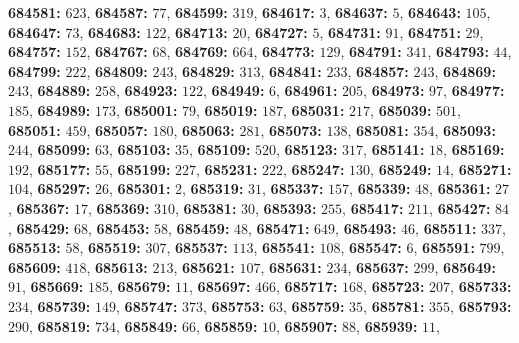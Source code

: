 \textsf{\bfseries 684581:} $623$, \textsf{\bfseries 684587:} $77$, \textsf{\bfseries 684599:} $319$, \textsf{\bfseries 684617:} $3$, \textsf{\bfseries 684637:} $5$, \textsf{\bfseries 684643:} $105$, \textsf{\bfseries 684647:} $73$, \textsf{\bfseries 684683:} $122$, \textsf{\bfseries 684713:} $20$, \textsf{\bfseries 684727:} $5$, \textsf{\bfseries 684731:} $91$, \textsf{\bfseries 684751:} $29$, \textsf{\bfseries 684757:} $152$, \textsf{\bfseries 684767:} $68$, \textsf{\bfseries 684769:} $664$, \textsf{\bfseries 684773:} $129$, \textsf{\bfseries 684791:} $341$, \textsf{\bfseries 684793:} $44$, \textsf{\bfseries 684799:} $222$, \textsf{\bfseries 684809:} $243$, \textsf{\bfseries 684829:} $313$, \textsf{\bfseries 684841:} $233$, \textsf{\bfseries 684857:} $243$, \textsf{\bfseries 684869:} $243$, \textsf{\bfseries 684889:} $258$, \textsf{\bfseries 684923:} $122$, \textsf{\bfseries 684949:} $6$, \textsf{\bfseries 684961:} $205$, \textsf{\bfseries 684973:} $97$, \textsf{\bfseries 684977:} $185$, \textsf{\bfseries 684989:} $173$, \textsf{\bfseries 685001:} $79$, \textsf{\bfseries 685019:} $187$, \textsf{\bfseries 685031:} $217$, \textsf{\bfseries 685039:} $501$, \textsf{\bfseries 685051:} $459$, \textsf{\bfseries 685057:} $180$, \textsf{\bfseries 685063:} $281$, \textsf{\bfseries 685073:} $138$, \textsf{\bfseries 685081:} $354$, \textsf{\bfseries 685093:} $244$, \textsf{\bfseries 685099:} $63$, \textsf{\bfseries 685103:} $35$, \textsf{\bfseries 685109:} $520$, \textsf{\bfseries 685123:} $317$, \textsf{\bfseries 685141:} $18$, \textsf{\bfseries 685169:} $192$, \textsf{\bfseries 685177:} $55$, \textsf{\bfseries 685199:} $227$, \textsf{\bfseries 685231:} $222$, \textsf{\bfseries 685247:} $130$, \textsf{\bfseries 685249:} $14$, \textsf{\bfseries 685271:} $104$, \textsf{\bfseries 685297:} $26$, \textsf{\bfseries 685301:} $2$, \textsf{\bfseries 685319:} $31$, \textsf{\bfseries 685337:} $157$, \textsf{\bfseries 685339:} $48$, \textsf{\bfseries 685361:} $27$, \textsf{\bfseries 685367:} $17$, \textsf{\bfseries 685369:} $310$, \textsf{\bfseries 685381:} $30$, \textsf{\bfseries 685393:} $255$, \textsf{\bfseries 685417:} $211$, \textsf{\bfseries 685427:} $84$, \textsf{\bfseries 685429:} $68$, \textsf{\bfseries 685453:} $58$, \textsf{\bfseries 685459:} $48$, \textsf{\bfseries 685471:} $649$, \textsf{\bfseries 685493:} $46$, \textsf{\bfseries 685511:} $337$, \textsf{\bfseries 685513:} $58$, \textsf{\bfseries 685519:} $307$, \textsf{\bfseries 685537:} $113$, \textsf{\bfseries 685541:} $108$, \textsf{\bfseries 685547:} $6$, \textsf{\bfseries 685591:} $799$, \textsf{\bfseries 685609:} $418$, \textsf{\bfseries 685613:} $213$, \textsf{\bfseries 685621:} $107$, \textsf{\bfseries 685631:} $234$, \textsf{\bfseries 685637:} $299$, \textsf{\bfseries 685649:} $91$, \textsf{\bfseries 685669:} $185$, \textsf{\bfseries 685679:} $11$, \textsf{\bfseries 685697:} $466$, \textsf{\bfseries 685717:} $168$, \textsf{\bfseries 685723:} $207$, \textsf{\bfseries 685733:} $234$, \textsf{\bfseries 685739:} $149$, \textsf{\bfseries 685747:} $373$, \textsf{\bfseries 685753:} $63$, \textsf{\bfseries 685759:} $35$, \textsf{\bfseries 685781:} $355$, \textsf{\bfseries 685793:} $290$, \textsf{\bfseries 685819:} $734$, \textsf{\bfseries 685849:} $66$, \textsf{\bfseries 685859:} $10$, \textsf{\bfseries 685907:} $88$, \textsf{\bfseries 685939:} $11$, 
